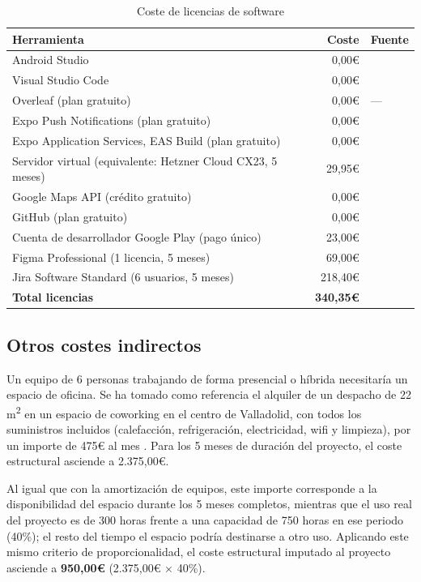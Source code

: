 \begin{table}[ht!]
\centering
\begin{tabular}{|l|r|l|}
\hline
\textbf{Herramienta} & \textbf{Coste} & \textbf{Fuente} \\
\hline
Android Studio & 0,00€ & \cite{androidstudio} \\
\hline
Visual Studio Code & 0,00€ & \cite{vscode} \\
\hline
Overleaf (plan gratuito) & 0,00€ & --- \\
\hline
Expo Push Notifications (plan gratuito) & 0,00€ & \cite{expo} \\
\hline
Expo Application Services, EAS Build (plan gratuito) & 0,00€ & \cite{expo} \\
\hline
Servidor virtual (equivalente: Hetzner Cloud CX23, 5 meses) & 29,95€ & \cite{hetznerPricing} \\
\hline
Google Maps API (crédito gratuito) & 0,00€ & \cite{googlemapsapi} \\
\hline
GitHub (plan gratuito) & 0,00€ & \cite{github} \\
\hline
Cuenta de desarrollador Google Play (pago único) & 23,00€ & \cite{googlePlayFee} \\
\hline
Figma Professional (1 licencia, 5 meses) & 69,00€ & \cite{figmaPricing} \\
\hline
Jira Software Standard (6 usuarios, 5 meses) & 218,40€ & \cite{jiraPricing} \\
\hline
\textbf{Total licencias} & \textbf{340,35€} & \\
\hline
\end{tabular}
\caption{Coste de licencias de software}
\label{tab:licencias}
\end{table}

\subsection{Otros costes indirectos}

Un equipo de 6 personas trabajando de forma presencial o híbrida necesitaría un espacio de oficina. Se ha tomado como referencia el alquiler de un despacho de 22 m\textsuperscript{2} en un espacio de coworking en el centro de Valladolid, con todos los suministros incluidos (calefacción, refrigeración, electricidad, wifi y limpieza), por un importe de 475€ al mes \cite{oficinaValladolid}. Para los 5 meses de duración del proyecto, el coste estructural asciende a 2.375,00€.

Al igual que con la amortización de equipos, este importe corresponde a la disponibilidad del espacio durante los 5 meses completos, mientras que el uso real del proyecto es de 300 horas frente a una capacidad de 750 horas en ese periodo (40\%); el resto del tiempo el espacio podría destinarse a otro uso. Aplicando este mismo criterio de proporcionalidad, el coste estructural imputado al proyecto asciende a \textbf{950,00€} (2.375,00€ × 40\%).

